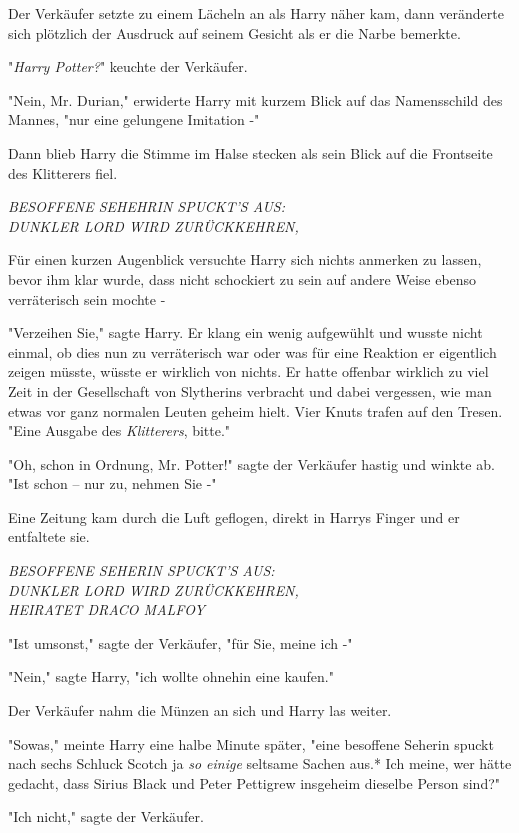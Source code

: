 {Der Verkäufer setzte zu einem Lächeln an als Harry näher kam, dann veränderte sich plötzlich der Ausdruck auf seinem Gesicht als er die Narbe bemerkte.

"\emph{Harry Potter?}" keuchte der Verkäufer.

"Nein, Mr. Durian," erwiderte Harry mit kurzem Blick auf das Namensschild des Mannes, "nur eine gelungene Imitation -"

Dann blieb Harry die Stimme im Halse stecken als sein Blick auf die Frontseite des Klitterers fiel.

\emph{BESOFFENE SEHEHRIN SPUCKT'S AUS:\\ DUNKLER LORD WIRD ZURÜCKKEHREN,}

Für einen kurzen Augenblick versuchte Harry sich nichts anmerken zu lassen, bevor ihm klar wurde, dass nicht schockiert zu sein auf andere Weise ebenso verräterisch sein mochte -

"Verzeihen Sie," sagte Harry. Er klang ein wenig aufgewühlt und wusste nicht einmal, ob dies nun zu verräterisch war oder was für eine Reaktion er eigentlich zeigen müsste, wüsste er wirklich von nichts. Er hatte offenbar wirklich zu viel Zeit in der Gesellschaft von Slytherins verbracht und dabei vergessen, wie man etwas vor ganz normalen Leuten geheim hielt. Vier Knuts trafen auf den Tresen. "Eine Ausgabe des \emph{Klitterers}, bitte."

"Oh, schon in Ordnung, Mr. Potter!" sagte der Verkäufer hastig und winkte ab. "Ist schon -- nur zu, nehmen Sie -"

Eine Zeitung kam durch die Luft geflogen, direkt in Harrys Finger und er entfaltete sie.

\emph{BESOFFENE SEHERIN SPUCKT'S AUS:\\ DUNKLER LORD WIRD ZURÜCKKEHREN,\\ HEIRATET DRACO MALFOY}

"Ist umsonst," sagte der Verkäufer, "für Sie, meine ich -"

"Nein," sagte Harry, "ich wollte ohnehin eine kaufen."

Der Verkäufer nahm die Münzen an sich und Harry las weiter.

"Sowas," meinte Harry eine halbe Minute später, "eine besoffene Seherin spuckt nach sechs Schluck Scotch ja \emph{so einige} seltsame Sachen aus.* Ich meine, wer hätte gedacht, dass Sirius Black und Peter Pettigrew insgeheim dieselbe Person sind?"

"Ich nicht," sagte der Verkäufer.

}
